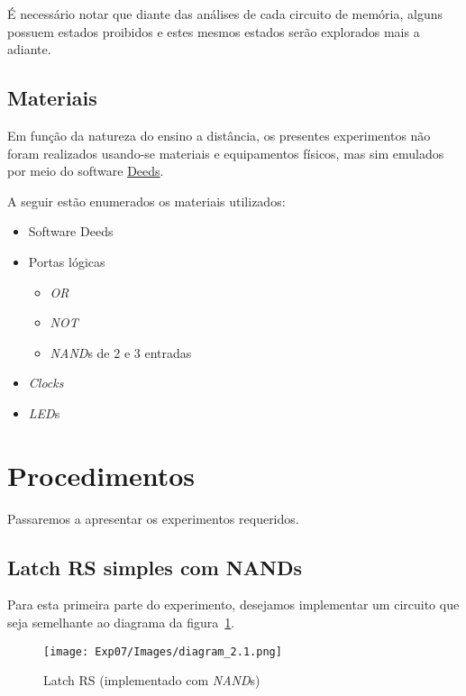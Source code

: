 \documentclass[12pt]{article}
\begin{document}
É necessário notar que diante das análises de cada circuito de memória, alguns
possuem estados proibidos e estes mesmos estados serão explorados mais a
adiante.

\subsection{Materiais}\label{sec:Materiais}

Em função da natureza do ensino a distância, os presentes experimentos não foram
realizados usando-se materiais e equipamentos físicos, mas sim emulados por meio
do software
\href{https://www.digitalelectronicsdeeds.com/downloads.html}{Deeds}.

A seguir estão enumerados os materiais utilizados:
\begin{itemize}
    \item Software Deeds
    \item Portas lógicas
    \begin{itemize}
      \item \emph{OR}
      \item \emph{NOT}
      \item \emph{NAND}s de $2$ e $3$ entradas
    \end{itemize}
    \item \emph{Clocks}
    \item \emph{LED}s
\end{itemize}

\section{Procedimentos}\label{sec:Procedimentos}

Passaremos a apresentar os experimentos requeridos.

\subsection{Latch RS simples com \textbf{NAND}s}\label{sec:2.1}

Para esta primeira parte do experimento, desejamos implementar um circuito que
seja semelhante ao diagrama da figura~\ref{fig:diagram_2.1.png}.

\begin{figure}[H]
  \centering
  \texttt{[image: Exp07/Images/diagram\_2.1.png]}
  \caption{Latch RS (implementado com \emph{NAND}s)}\label{fig:diagram_2.1.png}
\end{figure}
\end{document}
